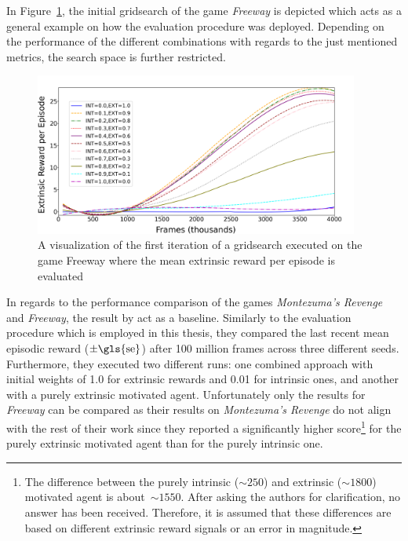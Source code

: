 \documentclass[draft,final]{vutinfth} %
\begin{document}
    In Figure~\ref{fig:gridsearch_evaluation}, the initial gridsearch of the game \textit{Freeway} is depicted which acts as a general example on how the evaluation procedure was deployed.
    Depending on the performance of the different combinations with regards to the just mentioned metrics, the search space is further restricted.

    \begin{figure}[h]
        \centering
        \includegraphics[width=0.95\textwidth]{figures/example_grid_search.png}
        \caption[A visualization of the first iteration of an executed gridsearch for the game Freeway]{A visualization of the first iteration of a gridsearch executed on the game Freeway where the mean extrinsic reward per episode is evaluated}
        \label{fig:gridsearch_evaluation}
    \end{figure}

    In regards to the performance comparison of the games \textit{Montezuma's Revenge} and \textit{Freeway}, the result by \citet[see Table 2]{burda_large-scale_2018-1} act as a baseline.
    Similarly to the evaluation procedure which is employed in this thesis, they compared the last recent mean episodic reward ($\pm\text{\gls{se}}$) after 100 million frames across three different seeds.
    Furthermore, they executed two different runs: one combined approach with initial weights of 1.0 for extrinsic rewards and 0.01 for intrinsic ones, and another with a purely extrinsic motivated agent.
    Unfortunately only the results for \textit{Freeway} can be compared as their results on \textit{Montezuma's Revenge} do not align with the rest of their work since they reported a significantly higher score\footnote{The difference between the purely intrinsic ($\sim250$) and extrinsic ($\sim1800$) motivated agent is about~$\sim1550$. After asking the authors \citet{burda_large-scale_2018-1} for clarification, no answer has been received. Therefore, it is assumed that these differences are based on different extrinsic reward signals or an error in magnitude.} for the purely extrinsic motivated agent than for the purely intrinsic one.
\end{document}
